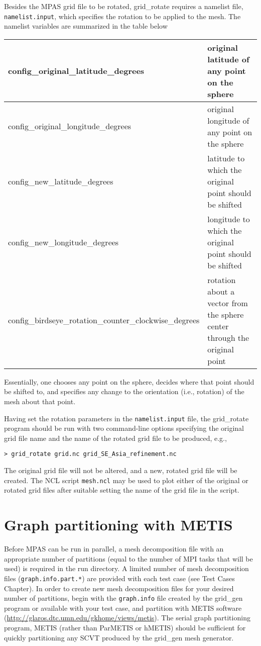 Besides the MPAS grid file to be rotated, grid\_rotate requires a namelist file, {\tt namelist.input}, which specifies the rotation to be applied to the mesh. The namelist variables are summarized in the table below
   
\vspace{12pt}
\begin{longtable}{|p{3.25in} |p{2.5in}|}
\hline
config\_original\_latitude\_degrees & original latitude of any point on the sphere \\ \hline
config\_original\_longitude\_degrees & original longitude of any point on the sphere \\ \hline
config\_new\_latitude\_degrees &  latitude to which the original point should be shifted \\ \hline
config\_new\_longitude\_degrees &  longitude to which the original point should be shifted \\ \hline
config\_birdseye\_rotation\_counter\_clockwise\_degrees & rotation about a vector from the sphere center through the original point \\ \hline
\end{longtable}
\vspace{12pt}

\noindent Essentially, one chooses any point on the sphere, decides where that point should be shifted to,
and specifies any change to the orientation (i.e., rotation) of the mesh about that point. 

Having set the rotation parameters in the {\tt namelist.input} file, the grid\_rotate program should be run with two command-line options
specifying the original grid file name and the name of the rotated grid file to be produced, e.g.,

\vspace{12pt}
{\tt > grid\_rotate grid.nc grid\_SE\_Asia\_refinement.nc}
\vspace{12pt}

The original grid file will not be altered, and a new, rotated grid file will be created. The NCL script {\tt mesh.ncl} may be used to plot either of the original or rotated grid files after suitable setting the name of the grid file in the script.
   
   
\section{Graph partitioning with METIS} 
\label{sec:metis}

Before MPAS can be run in parallel, a mesh decomposition file with an appropriate number of 
partitions (equal to the number of MPI tasks that will be used) is required in the run directory.  A limited number of mesh decomposition files ({\tt graph.info.part.*}) are provided with each test case (see Test Cases Chapter).  In order to create new mesh decomposition files for your desired number of partitions, begin with the {\tt graph.info} file created by the grid\_gen program or available with your test case, and partition with METIS software (\url{http://glaros.dtc.umn.edu/gkhome/views/metis}). The serial graph partitioning program, METIS (rather than ParMETIS or hMETIS) should be sufficient for quickly partitioning any SCVT produced by the grid\_gen mesh generator.


